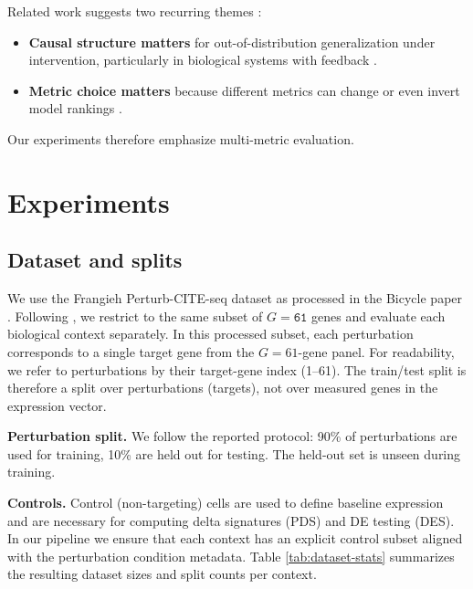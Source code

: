 \documentclass[12pt]{article}
\begin{document}
Related work suggests two recurring themes
\cite{rohbeck2024bicycle,nilforoshan2023zeroshot,virtualcellchallenge_eval,liu2025pds}:
\begin{itemize}
    \item \textbf{Causal structure matters} for out-of-distribution generalization under intervention, particularly in biological systems with feedback
    \cite{rohbeck2024bicycle,nilforoshan2023zeroshot}.
    \item \textbf{Metric choice matters} because different metrics can change or even invert model rankings
    \cite{virtualcellchallenge_eval,liu2025pds}.
\end{itemize}
Our experiments therefore emphasize multi-metric evaluation.

\section{Experiments}\label{experiments}

\subsection{Dataset and splits}
We use the Frangieh Perturb-CITE-seq dataset as processed in the Bicycle paper
\cite{rohbeck2024bicycle,frangieh2021perturbcite}. Following \cite{rohbeck2024bicycle}, we
restrict to the same subset of \(G=\texttt{61}\) genes and evaluate each biological context separately. In this processed subset, each perturbation corresponds to a single target gene from the \(G=61\)-gene panel.
For readability, we refer to perturbations by their target-gene index (1--61). The train/test split is therefore
a split over perturbations (targets), not over measured genes in the expression vector.

\textbf{Perturbation split.} We follow the reported protocol: 90\% of perturbations are used for
training, 10\% are held out for testing. The held-out set is unseen during training.

\textbf{Controls.} Control (non-targeting) cells are used to define baseline expression and are
necessary for computing delta signatures (PDS) and DE testing (DES). In our pipeline we ensure
that each context has an explicit control subset aligned with the perturbation condition metadata. Table \ref{tab:dataset-stats} summarizes the resulting dataset sizes and split counts per context.
\end{document}

